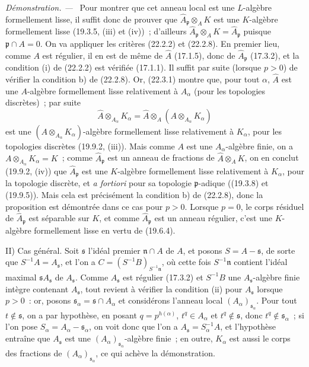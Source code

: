 \documentclass[10pt,oneside]{book}
\newenvironment{proof}{%
  \par\medskip\noindent\textit{Démonstration. ---\ }}{\par}
\begin{document}
\begin{proof}
Pour montrer que cet anneau local est une $L$-algèbre formellement lisse,
il suffit donc de prouver que $\widehat A_\mathfrak p\otimes_A K$ est une
$K$-algèbre formellement lisse (19.3.5, (iii) et (iv))~; d'ailleurs
$\widehat A_\mathfrak p\otimes_A K=\widehat A_\mathfrak p$ puisque
$\mathfrak p\cap A=0$. On va appliquer les critères (22.2.2) et (22.2.8).
En premier lieu, comme $A$ est régulier, il en est de même de $\widehat A$
(17.1.5), donc de $\widehat A_\mathfrak p$ (17.3.2), et la condition (i) de
(22.2.2) est vérifiée (17.1.1). Il suffit par suite (lorsque $p>0$) de
vérifier la condition b) de (22.2.8). Or, (22.3.1) montre que, pour tout
$\alpha$, $\widehat A$ est une $A$-algèbre formellement lisse relativement
à $A_\alpha$ (pour les topologies discrètes)~; par suite
\[
  \widehat A\otimes_{A_\alpha}K_\alpha
  =\widehat A\otimes_A(A\otimes_{A_\alpha}K_\alpha)
\]
est une $(A\otimes_{A_\alpha}K_\alpha)$-algèbre formellement lisse
relativement à $K_\alpha$, pour les topologies discrètes (19.9.2, (iii)).
Mais comme $A$ est une $A_\alpha$-algèbre finie, on a
$A\otimes_{A_\alpha}K_\alpha=K$~; comme $\widehat A_\mathfrak p$ est un
anneau de fractions de $\widehat A\otimes_A K$, on en conclut (19.9.2,
(iv)) que $\widehat A_\mathfrak p$ est une $K$-algèbre formellement lisse
relativement à $K_\alpha$, pour la topologie discrète, et \emph{a fortiori}
pour sa topologie $\mathfrak p$-adique ((19.3.8) et (19.9.5)). Mais cela est
précisément la condition b) de (22.2.8), donc la proposition est démontrée
dans ce cas pour $p>0$. Lorsque $p=0$, le corps résiduel de
$\widehat A_\mathfrak p$ est séparable sur $K$, et comme
$\widehat A_\mathfrak p$ est un anneau régulier, c'est une $K$-algèbre
formellement lisse en vertu de (19.6.4).

II) Cas général. Soit $\mathfrak s$ l'idéal premier $\mathfrak n\cap A$ de
$A$, et posons $S=A-\mathfrak s$, de sorte que $S^{-1}A=A_\mathfrak s$, et
l'on a $C=(S^{-1}B)_{S^{-1}\mathfrak n}$, où cette fois
$S^{-1}\mathfrak n$ contient l'idéal maximal
$\mathfrak sA_\mathfrak s$ de $A_\mathfrak s$. Comme $A_\mathfrak s$ est
régulier (17.3.2) et $S^{-1}B$ une $A_\mathfrak s$-algèbre finie intègre
contenant $A_\mathfrak s$, tout revient à vérifier la condition (ii) pour
$A_\mathfrak s$ lorsque $p>0$~: or, posons
$\mathfrak s_\alpha=\mathfrak s\cap A_\alpha$ et considérons l'anneau local
$(A_\alpha)_{\mathfrak s_\alpha}$. Pour tout $t\notin\mathfrak s$, on a par
hypothèse, en posant $q=p^{h(\alpha)}$, $t^q\in A_\alpha$ et
$t^q\notin\mathfrak s$, donc $t^q\notin\mathfrak s_\alpha$~; si l'on pose
$S_\alpha=A_\alpha-\mathfrak s_\alpha$, on voit donc que l'on a
$A_\mathfrak s=S_\alpha^{-1}A$, et l'hypothèse entraîne que
$A_\mathfrak s$ est une $(A_\alpha)_{\mathfrak s_\alpha}$-algèbre finie~;
en outre, $K_\alpha$ est aussi le corps des fractions de
$(A_\alpha)_{\mathfrak s_\alpha}$, ce qui achève la démonstration.
\end{proof}
\end{document}
